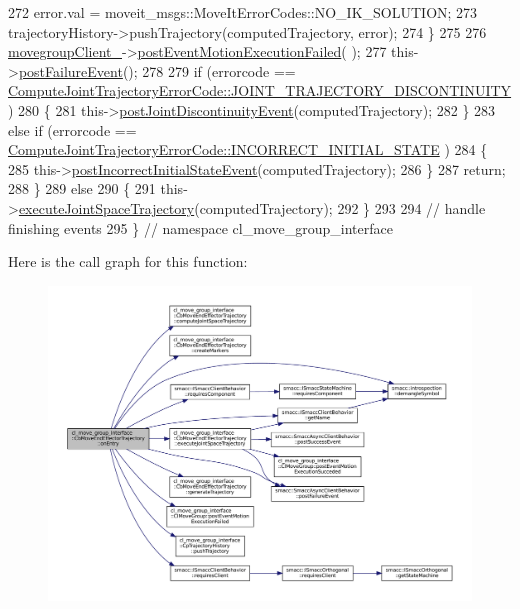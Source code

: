 \begin{DoxyCode}
272                 error.val = moveit\_msgs::MoveItErrorCodes::NO\_IK\_SOLUTION;
273                 trajectoryHistory->pushTrajectory(computedTrajectory, error);
274             \}
275 
276             \hyperlink{classcl__move__group__interface_1_1CbMoveEndEffectorTrajectory_aea650d3e7836125b32be97392b71a7f3}{movegroupClient\_}->\hyperlink{classcl__move__group__interface_1_1ClMoveGroup_a39dc3871d29b2af1ab739057f6ca6daa}{postEventMotionExecutionFailed}(
      );
277             this->\hyperlink{classsmacc_1_1SmaccAsyncClientBehavior_af6fa358cb1ab5ed16791a201f59260e0}{postFailureEvent}();
278 
279             \textcolor{keywordflow}{if} (errorcode == 
      \hyperlink{namespacecl__move__group__interface_ae5fc1caf9a16ae5ad1c97c2e137a7017a3e86842785cd7c42003e516418347c8e}{ComputeJointTrajectoryErrorCode::JOINT\_TRAJECTORY\_DISCONTINUITY}
      )
280             \{
281                 this->\hyperlink{classcl__move__group__interface_1_1CbMoveEndEffectorTrajectory_a308331beab9b2ec0eae72fa56fa999c9}{postJointDiscontinuityEvent}(computedTrajectory);
282             \}
283             \textcolor{keywordflow}{else} \textcolor{keywordflow}{if} (errorcode == 
      \hyperlink{namespacecl__move__group__interface_ae5fc1caf9a16ae5ad1c97c2e137a7017a1b748367c8d468cb9b65ecd6b2eab32c}{ComputeJointTrajectoryErrorCode::INCORRECT\_INITIAL\_STATE}
      )
284             \{
285                 this->\hyperlink{classcl__move__group__interface_1_1CbMoveEndEffectorTrajectory_a6180230347c922fa0d85f514ce5029df}{postIncorrectInitialStateEvent}(computedTrajectory);
286             \}
287             \textcolor{keywordflow}{return};
288         \}
289         \textcolor{keywordflow}{else}
290         \{
291             this->\hyperlink{classcl__move__group__interface_1_1CbMoveEndEffectorTrajectory_a3a75fa185c62591e1869427650338a32}{executeJointSpaceTrajectory}(computedTrajectory);
292         \}
293 
294         \textcolor{comment}{// handle finishing events}
295     \} \textcolor{comment}{// namespace cl\_move\_group\_interface}
\end{DoxyCode}
Here is the call graph for this function\+:
\nopagebreak
\begin{figure}[H]
\begin{center}
\leavevmode
\includegraphics[width=350pt]{classcl__move__group__interface_1_1CbMoveEndEffectorTrajectory_aaedd074fd178c6390a4a3f1ccff23ad3_cgraph}
\end{center}
\end{figure}
